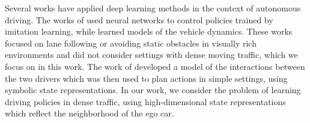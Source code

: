 \documentclass{article} %
\begin{document}
Several works have applied deep learning methods in the context of autonomous driving. The works of \citep{Pomerleau91, LeCun2006, Bojarski16, Pan17} used neural networks to control policies trained by imitation learning, while \citep{Williams2017} learned models of the vehicle dynamics. These works focused on lane following or avoiding static obstacles in visually rich environments and did not consider settings with dense moving traffic, which we focus on in this work. The work of \citep{Sadigh16} developed a model of the interactions between the two drivers which was then used to plan actions in simple settings, using symbolic state representations. In our work, we consider the problem of learning driving policies in dense traffic, using high-dimensional state representations which reflect the neighborhood of the ego car. %



\end{document}
